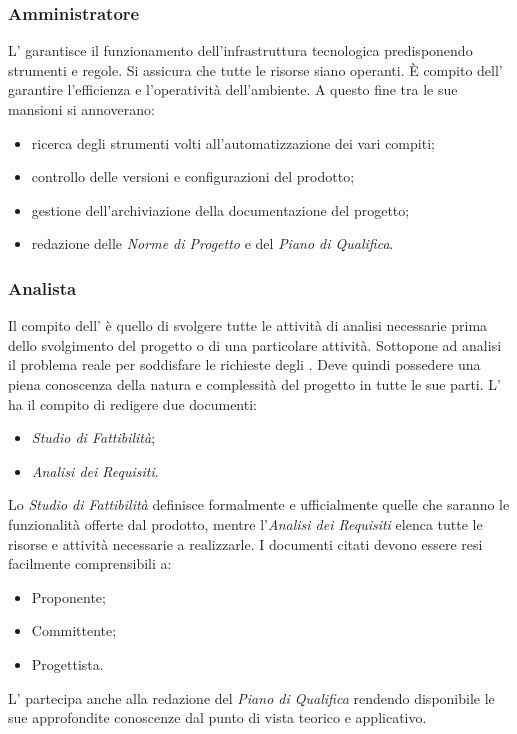 \subsubsection{Amministratore}
L'\Amministratore{} garantisce il funzionamento dell'infrastruttura tecnologica predisponendo strumenti e regole. Si assicura che tutte le risorse siano operanti. \`{E} compito dell'\Amministratore{} garantire l'efficienza e l'operatività dell'ambiente. A questo fine tra le sue mansioni si annoverano:
\begin{itemize}
	\item ricerca degli strumenti volti all'automatizzazione dei vari compiti;
	\item controllo delle versioni e configurazioni del prodotto;
	\item gestione dell'archiviazione della documentazione del progetto;
	\item redazione delle \textit{Norme di Progetto} e del \textit{Piano di Qualifica}.
\end{itemize}

\subsubsection{Analista}
Il compito dell'\Analista{} è quello di svolgere tutte le attività di analisi necessarie prima dello svolgimento del progetto o di una particolare attività. Sottopone ad analisi il problema reale per soddisfare le richieste degli . Deve quindi possedere una piena conoscenza della natura e complessità del progetto in tutte le sue parti. L'\Analista{} ha il compito di redigere due documenti:
\begin{itemize}
	\item \textit{Studio di Fattibilità};
	\item \textit{Analisi dei Requisiti}.
\end{itemize}
Lo \textit{Studio di Fattibilità} definisce formalmente e ufficialmente quelle che saranno le funzionalità offerte dal prodotto, mentre l'\textit{Analisi dei Requisiti} elenca tutte le risorse e attività necessarie a realizzarle. I documenti citati devono essere resi facilmente comprensibili a:
\begin{itemize}
	\item Proponente;
	\item Committente;
	\item Progettista.
\end{itemize}
L'\Analista{} partecipa anche alla redazione del \textit{Piano di Qualifica} rendendo disponibile le sue approfondite conoscenze dal punto di vista teorico e applicativo.

